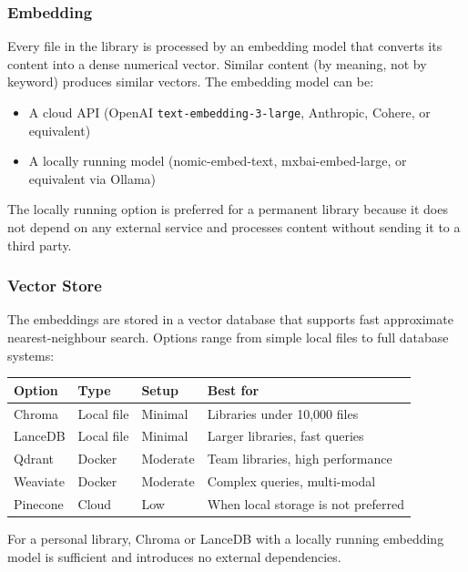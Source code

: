 \documentclass[12pt,letterpaper]{article}
\begin{document}
\subsubsection{Embedding}

Every file in the library is processed by an embedding model that converts
its content into a dense numerical vector. Similar content (by meaning,
not by keyword) produces similar vectors. The embedding model can be:

\begin{itemize}
  \item A cloud API (OpenAI \texttt{text-embedding-3-large}, Anthropic,
        Cohere, or equivalent)
  \item A locally running model (nomic-embed-text, mxbai-embed-large,
        or equivalent via Ollama)
\end{itemize}

The locally running option is preferred for a permanent library because
it does not depend on any external service and processes content without
sending it to a third party.

\subsubsection{Vector Store}

The embeddings are stored in a vector database that supports fast
approximate nearest-neighbour search. Options range from simple
local files to full database systems:

\begin{center}
\begin{tabular}{@{}llll@{}}
\toprule
\textbf{Option} & \textbf{Type} & \textbf{Setup} & \textbf{Best for} \\
\midrule
Chroma & Local file & Minimal & Libraries under 10,000 files \\
LanceDB & Local file & Minimal & Larger libraries, fast queries \\
Qdrant & Docker & Moderate & Team libraries, high performance \\
Weaviate & Docker & Moderate & Complex queries, multi-modal \\
Pinecone & Cloud & Low & When local storage is not preferred \\
\bottomrule
\end{tabular}
\end{center}

For a personal library, Chroma or LanceDB with a locally running
embedding model is sufficient and introduces no external dependencies.
\end{document}
